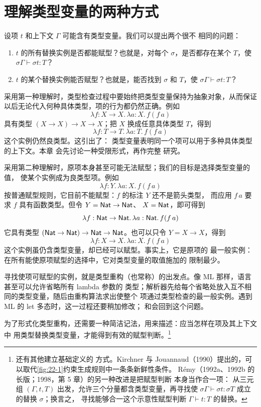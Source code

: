 \section{理解类型变量的两种方式}
\label{sec:22.2}

设项 \(t\) 和上下文 \(\Gamma\) 可能含有类型变量。我们可以提出两个很不
相同的问题：
\begin{enumerate}
  \item \(t\) 的所有替换实例是否都能赋型？也就是，对每个
        \(\sigma\)，是否都存在某个 \(T\)，使
        \(\sigma\Gamma\vdash\sigma t:T\)？
  \item \(t\) 的某个替换实例能否赋型？也就是，能否找到
        \(\sigma\) 和 \(T\)，使
        \(\sigma\Gamma\vdash\sigma t:T\)？
\end{enumerate}

采用第一种理解时，类型检查过程中要始终把类型变量保持为抽象对象，从而保证
以后无论代入何种具体类型，项的行为都仍然正确。例如
\[
\lambda f:X\to X.\,\lambda a:X.\,f(f\,a)
\]
具有类型 \((X\to X)\to X\to X\)；把 \(X\) 换成任意具体类型 \(T\)，得到
\[
\lambda f:T\to T.\,\lambda a:T.\,f(f\,a)
\]
这个实例仍然良类型。这引出了：
类型变量表明同一个项可以用于多种具体类型的上下文。本章
会先讨论一种受限形式，再作完整
研究。

采用第二种理解时，原项本身甚至可能无法赋型；我们的目标是选择类型变量的值，
使某个实例成为良类型项。例如
\[
\lambda f:Y.\,\lambda a:X.\,f(f\,a)
\]
按普通赋型规则，它目前不能赋型：\(f\) 的标注 \(Y\) 还不是箭头类型，
而应用 \(f\,a\) 要求 \(f\) 具有函数类型。但令
\(Y=\mathsf{Nat}\to\mathsf{Nat}\)、
\(X=\mathsf{Nat}\)，即可得到
\[
\lambda f:\mathsf{Nat}\to\mathsf{Nat}.\,
  \lambda a:\mathsf{Nat}.\,f(f\,a)
\]
它具有类型
\((\mathsf{Nat}\to\mathsf{Nat})\to\mathsf{Nat}\to
\mathsf{Nat}\)。也可以只令 \(Y=X\to X\)，得到
\[
\lambda f:X\to X.\,\lambda a:X.\,f(f\,a)
\]
这个实例虽仍含类型变量，却已经可以赋型。事实上，它是原项的
最一般实例：在所有能使原项赋型的选择中，它对类型变量的取值施加的
限制最少。

寻找使项可赋型的实例，就是类型重构（也常称）的出发点。像 ML 那样，语言甚至可以允许省略所有 lambda 参数的
类型；解析器先给每个省略处放入互不相同的类型变量，随后由重构算法求出使整个
项通过类型检查的最一般实例。遇到 ML 的 let 多态时，这一过程还要稍加修改；
和会回到这个问题。

为了形式化类型重构，还需要一种简洁记法，用来描述：应当怎样在项及其上下文中
用类型替换类型变量，才能得到有效的赋型判断。\footnote{还有其他建立基础定义的
方式。Kirchner 与 Jouannaud（1990）提出的，可以取代\cref{fig:22-1}约束生成规则中一条条新鲜性条件。
Rémy（1992a、1992b 的长版；1998，第 5 章）的另一种改进是把赋型判断
本身当作合一项：
从三元组 \((\Gamma,t,T)\) 出发，允许三个分量都含类型变量，再寻找使
\(\sigma\Gamma\vdash\sigma t:\sigma T\) 成立的替换 \(\sigma\)；换言之，
寻找能够合一这个示意性赋型判断 \(\Gamma\vdash t:T\) 的替换。}

